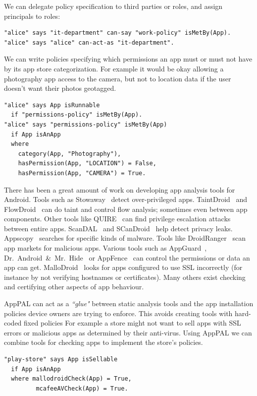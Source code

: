 \documentclass[]{llncs}
\newcommand{\citep}[1]{\cite{#1}}
\begin{document}
We can delegate policy specification to third parties or roles, and assign principals to roles:
\begin{lstlisting}
"alice" says "it-department" can-say "work-policy" isMetBy(App).
"alice" says "alice" can-act-as "it-department".
\end{lstlisting}
We can write policies specifying which permissions an app must or must not have by its app store categorization.
For example it would be okay allowing a photography app access to the camera, but not to location data if the user doesn't want their photos geotagged.
\begin{lstlisting}
"alice" says App isRunnable
  if "permissions-policy" isMetBy(App).
"alice" says "permissions-policy" isMetBy(App)
  if App isAnApp
  where
    category(App, "Photography"),
    hasPermission(App, "LOCATION") = False,
    hasPermission(App, "CAMERA") = True.
\end{lstlisting}

There has been a great amount of work on developing app analysis tools for Android.
Tools such as Stowaway~\cite{Felt:2011kj} detect over-privileged apps.
TaintDroid~\cite{Enck:2010uw} and FlowDroid~\cite{Fritz:2013vi} can do taint and control flow analysis; sometimes even between app components.
Other tools like QUIRE~\cite{Bugiel:2012ui} can find privilege escalation attacks between entire apps.
ScanDAL~\cite{Kim:2012vt} and SCanDroid~\cite{Fuchs:2009vi} help detect privacy leaks.
Appscopy~\cite{Feng:kPGZr_ja} searches for specific kinds of malware.
Tools like DroidRanger~\cite{Zhou:2012tb} scan app markets for malicious apps.
Various tools such as AppGuard~\cite{Backes:2012vm}, Dr.~Android~\&~Mr.~Hide~\cite{Jeon:2012ki} or AppFence~\cite{Hornyack:2011wq} can control the permissions or data an app can get.
MalloDroid~\citep{Fahl:2012dj} looks for apps configured to use SSL incorrectly (for instance by not verifying hostnames or certificates).
Many others exist checking and certifying other aspects of app behaviour.

AppPAL can act as a \emph{``glue"} between static analysis tools and the app installation policies device owners are trying to enforce.
This avoids creating tools with hard-coded fixed policies
For example a store might not want to sell apps with SSL errors or malicious apps as determined by their anti-virus.
Using AppPAL we can combine tools for checking apps to implement the store's policies.
\begin{lstlisting}
"play-store" says App isSellable
  if App isAnApp
  where mallodroidCheck(App) = True,
         mcafeeAVCheck(App) = True.
\end{lstlisting}
\end{document}
